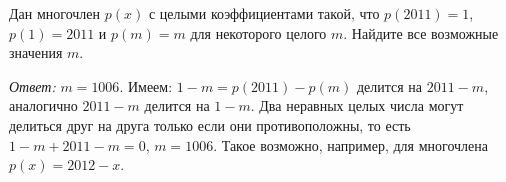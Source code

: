 Дан многочлен $p(x)$ с целыми коэффициентами такой, что
$p(2011) = 1$, $p(1) = 2011$ и $p(m) = m$ для некоторого целого $m$.
Найдите все возможные значения $m$.


\solution
\emph{Ответ:} $m = 1006$.
Имеем: $1 - m = p(2011) - p(m)$ делится на $2011 - m$, аналогично $2011 - m$
делится на $1 - m$.
Два неравных целых числа могут делиться друг на друга только если они
противоположны, то есть $1 - m + 2011 - m = 0$, $m = 1006$.
Такое возможно, например, для многочлена $p(x) = 2012 - x$.

